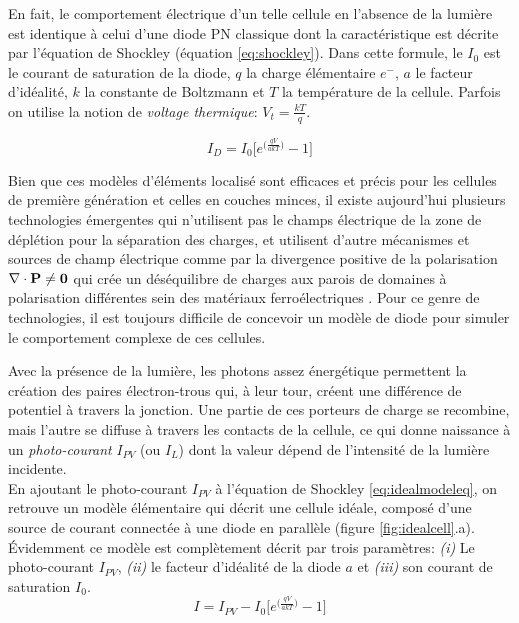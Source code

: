 En fait, le comportement électrique d'un telle cellule en l'absence de la lumière est identique à celui d'une diode PN classique dont la caractéristique est décrite par l'équation de Shockley (équation \ref{eq:shockley}). Dans cette formule, le $I_0$ est le courant de saturation de la diode, $q$ la charge élémentaire $e^{-}$, $a$ le facteur d'idéalité, $k$ la constante de Boltzmann et $T$ la température de la cellule. Parfois on utilise la notion de \textit{voltage thermique}: $V_t = \frac{kT}{q}$.

\begin{equation}
\label{eq:shockley}
  I_D = I_0 \bigg[e^{\big(\frac{qV}{akT}\big)} - 1\bigg]
\end{equation}

Bien que ces modèles d'éléments localisé sont efficaces et précis pour les cellules de première génération et celles en couches minces, il existe aujourd'hui plusieurs technologies émergentes qui n'utilisent pas le champs électrique de la zone de déplétion pour la séparation des charges, et utilisent d'autre mécanismes et sources de champ électrique comme par la divergence positive de la polarisation $\nabla \cdot \bf{P} \neq 0$ qui crée un déséquilibre de charges aux parois de domaines à polarisation différentes sein des matériaux ferroélectriques \cite{Huang2010}. Pour ce genre de technologies, il est toujours difficile de concevoir un modèle de diode pour simuler le comportement complexe de ces cellules.


Avec la présence de la lumière, les photons assez énergétique permettent la création des paires électron-trous qui, à leur tour, créent une différence de potentiel à travers la jonction. Une partie de ces porteurs de charge se recombine, mais l'autre se diffuse à travers les contacts de la cellule, ce qui donne naissance à un \textit{photo-courant} $I_{PV}$ (ou $I_L$) dont la valeur dépend de l'intensité de la lumière incidente.\\
En ajoutant le photo-courant $I_{PV}$ à l'équation de Shockley \ref{eq:idealmodeleq}, on retrouve un modèle élémentaire qui décrit une cellule idéale, composé d'une source de courant connectée à une diode en parallèle (figure \ref{fig:idealcell}.a). Évidemment ce modèle est complètement décrit par trois paramètres: \textit{(i)} Le photo-courant $I_{PV}$, \textit{(ii)} le facteur d'idéalité de la diode $a$ et \textit{(iii)} son courant de saturation $I_0$. 
\begin{equation}
\label{eq:idealmodeleq}
  I = I_{PV} - I_0 \bigg[e^{\big(\frac{qV}{akT}\big)} - 1\bigg]
\end{equation}

